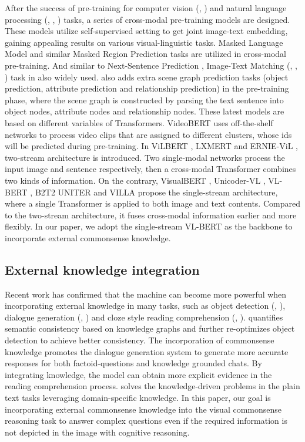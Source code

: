 \documentclass[conference]{IEEEtran}
\begin{document}
After the success of pre-training for computer vision (\cite{b21}, \cite{b22}) and natural language processing (\cite{b11}, \cite{b25}, \cite{b27}) tasks, a series of cross-modal pre-training models are designed. These models utilize self-supervised setting to get joint image-text embedding, gaining appealing results on various visual-linguistic tasks. Masked Language Model \cite{b11} and similar Masked Region Prediction \cite{b13} tasks are utilized in cross-modal pre-training. And similar to Next-Sentence Prediction \cite{b11}, Image-Text Matching (\cite{b13}, \cite{b14}, \cite{b20}) task in also widely used. \cite{b20} also adds extra scene graph prediction tasks (object prediction, attribute prediction and relationship prediction) in the pre-training phase, where the scene graph is constructed by parsing the text sentence into object nodes, attribute nodes and relationship nodes. These latest models are based on different variables of Transformers. VideoBERT \cite{b28} uses off-the-shelf networks to process video clips that are assigned to different clusters, whose ids will be predicted during pre-training. In ViLBERT \cite{b13}, LXMERT \cite{b29} and ERNIE-ViL \cite{yu2020ernie}, two-stream architecture is introduced. Two single-modal networks process the input image and sentence respectively, then a cross-modal Transformer combines two kinds of information. On the contrary, VisualBERT \cite{b12}, Unicoder-VL \cite{b19}, VL-BERT \cite{b14}, B2T2 \cite{b15} UNITER \cite{b20} and VILLA \cite{gan2020large} propose the single-stream architecture, where a single Transformer is applied to both image and text contents. Compared to the two-stream architecture, it fuses cross-modal information earlier and more flexibly. In our paper, we adopt the single-stream VL-BERT as the backbone to incorporate external commonsense knowledge.

\subsection{External knowledge integration}


Recent work has confirmed that the machine can become more powerful when incorporating external knowledge in many tasks, such as object detection (\cite{b30}, \cite{b43}), dialogue generation (\cite{b31}, {\cite{b44}}) and cloze style reading comprehension (\cite{b32}, \cite{b45}). \cite{b30} quantifies semantic consistency based on knowledge graphs and further re-optimizes object detection to achieve better consistency. The incorporation of commonsense knowledge promotes the dialogue generation system \cite{b31} to generate more accurate responses for both factoid-questions and knowledge grounded chats. By integrating knowledge, the model \cite{b32} can obtain more explicit evidence in the reading comprehension process. \cite{b16} solves the knowledge-driven problems in the plain text tasks leveraging domain-specific knowledge. In this paper, our goal is incorporating external commonsense knowledge into the visual commonsense reasoning task to answer complex questions even if the required information is not depicted in the image with cognitive reasoning.
\end{document}
